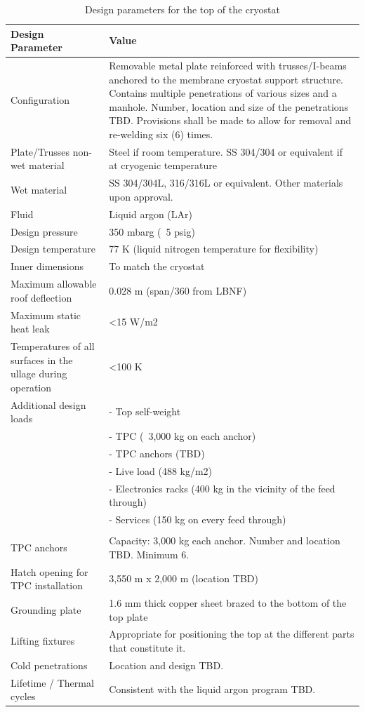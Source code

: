 \begin{table}[htpb]
\caption{Design parameters for the top of the cryostat}
\label{tbl:cryostat-top-parameters}
\centering
\begin{tabular}{|p{}|p{}|}
\hline
 \textbf{Design Parameter} & \textbf{Value} \\ \hline
 Configuration &  Removable metal plate reinforced with trusses/I-beams anchored to the membrane cryostat support structure. Contains multiple penetrations of various sizes and a manhole. Number, location and size of the penetrations TBD. Provisions shall be made to allow for removal and re-welding six (6) times.\\ \hline
Plate/Trusses non-wet material  &  Steel if room temperature.
SS 304/304 or equivalent if at cryogenic temperature
\\ \hline
Wet material  & SS 304/304L, 316/316L or equivalent. 
Other materials upon approval.
 \\ \hline
 Fluid & Liquid argon (LAr) \\ \hline
Design pressure  & 350 mbarg (~5 psig) \\ \hline
Design temperature  & 77 K (liquid nitrogen temperature for flexibility) \\ \hline
Inner dimensions  & To match the cryostat \\ \hline
Maximum allowable roof deflection  & 0.028 m (span/360 from LBNF) \\ \hline
Maximum static heat leak  & \textless 15 W/m2  \\ \hline
 Temperatures of all surfaces in the ullage during operation & \textless 100 K \\ \hline
Additional design loads  &  -	Top self-weight \\
& -	TPC (~3,000 kg on each anchor)\\
& -	TPC anchors (TBD)\\
& -	Live load (488 kg/m2)\\
& -	Electronics racks (400 kg in the vicinity of the feed through)\\
& -	Services (150 kg on every feed through)\\
\\ \hline
TPC anchors  & Capacity: 3,000 kg each anchor.
Number and location TBD. Minimum 6.
 \\ \hline
 Hatch opening for TPC installation &  3,550 m x 2,000 m (location TBD)\\ \hline
Grounding plate  &  1.6 mm thick copper sheet brazed to the bottom of the top plate\\ \hline
Lifting fixtures  & Appropriate for positioning the top at the different parts that constitute it. \\ \hline
Cold penetrations  & Location and design TBD. \\ \hline
Lifetime / Thermal cycles  & Consistent with the liquid argon program TBD. \\ \hline
\end{tabular}
\end{table}

